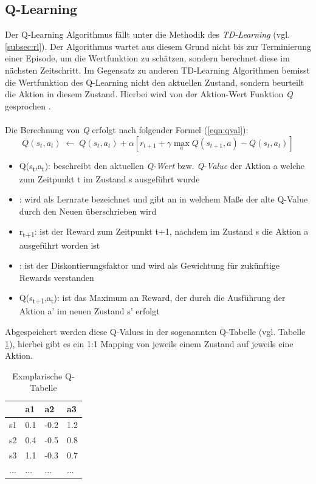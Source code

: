 \subsection{Q-Learning}
\label{subsec:y-ql}
Der Q-Learning Algorithmus fällt unter die Methodik des \textit{TD-Learning} (vgl. \ref{subsec:rl}). Der Algorithmus wartet aus diesem Grund nicht bis zur Terminierung einer Episode, um die Wertfunktion zu schätzen, sondern berechnet diese im nächsten Zeitschritt. Im Gegensatz zu anderen TD-Learning Algorithmen bemisst die Wertfunktion des Q-Learning nicht den aktuellen Zustand, sondern  beurteilt die Aktion in diesem Zustand. Hierbei wird von der Aktion-Wert Funktion \textit{Q} gesprochen \cite{Sutton}.\\\\
Die Berechnung von \textit{Q} erfolgt nach folgender Formel (\ref{eqn:qval}):
\begin{equation} \label{eqn:qval}
	Q(s_t,a_t)\;\leftarrow\;Q(s_t,a_t) + \alpha [ r_{t+1} + \gamma \max_a
	Q(s_{t+1},a) - Q(s_t,a_t) ]
\end{equation}
\begin{itemize}
	\item Q(s\textsubscript{t},a\textsubscript{t}): beschreibt den aktuellen \textit{Q-Wert} bzw. \textit{Q-Value} der Aktion a welche zum Zeitpunkt t im Zustand s ausgeführt wurde
	\item \textalpha: wird als Lernrate bezeichnet und gibt an in welchem Maße der alte Q-Value durch den Neuen überschrieben wird
	\item r\textsubscript{t+1}: ist der Reward zum Zeitpunkt t+1, nachdem im Zustand s die Aktion a ausgeführt worden ist
	\item \textgamma: ist der Diskontierungsfaktor und wird als Gewichtung für zukünftige Rewards verstanden 
	\item {}Q(s\textsubscript{t+1},a\textsubscript{t}): ist das Maximum an Reward, der durch die Ausführung der Aktion a' im neuen Zustand s' erfolgt
\end{itemize}

Abgespeichert werden diese Q-Values in der sogenannten Q-Tabelle (vgl. Tabelle \ref{table:qtable}), hierbei gibt es ein 1:1 Mapping von jeweils einem Zustand auf jeweils eine Aktion. 

\begin{table}[h!]
	\begin{center}
		\caption{Exmplarische Q-Tabelle}
		\begin{tabular}{| l | l | l | l |}
			\hline
			    & a1  & a2   & a3  \\ \hline
			s1  & 0.1 & -0.2 & 1.2 \\ \hline
			s2  & 0.4 & -0.5 & 0.8 \\ \hline
			s3  & 1.1 & -0.3 & 0.7 \\ \hline
			... & ... & ...  & ... \\ \hline
		\end{tabular}
		\label{table:qtable}
	\end{center}
\end{table}

